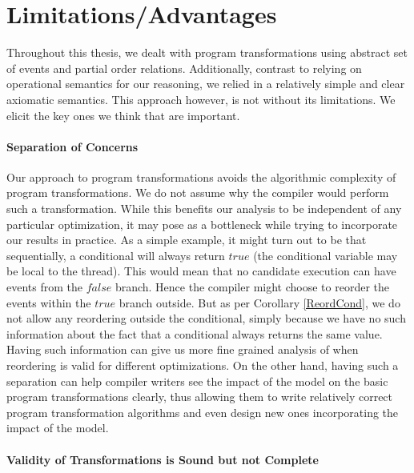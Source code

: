 \section{Limitations/Advantages}

    Throughout this thesis, we dealt with program transformations using abstract set of events and partial order relations. 
    Additionally, contrast to relying on operational semantics for our reasoning, we relied in a relatively simple and clear axiomatic semantics. 
    This approach however, is not without its limitations. 
    We elicit the key ones we think that are important. 

    \paragraph{Separation of Concerns}
    Our approach to program transformations avoids the algorithmic complexity of program transformations. 
    We do not assume why the compiler would perform such a transformation.
    While this benefits our analysis to be independent of any particular optimization, it may pose as a bottleneck while trying to incorporate our results in practice. 
    As a simple example, it might turn out to be that sequentially, a conditional will always return $true$ (the conditional variable may be local to the thread). 
    This would mean that no candidate execution can have events from the $false$ branch. 
    Hence the compiler might choose to reorder the events within the $true$ branch outside. 
    But as per Corollary \ref{ReordCond}, we do not allow any reordering outside the conditional, simply because we have no such information about the fact that a conditional always returns the same value. 
    Having such information can give us more fine grained analysis of when reordering is valid for different optimizations. 
    On the other hand, having such a separation can help compiler writers see the impact of the model on the basic program transformations clearly, thus allowing them to write relatively correct program transformation algorithms and even design new ones incorporating the impact of the model. 

    \paragraph{Validity of Transformations is Sound but not Complete}
   
